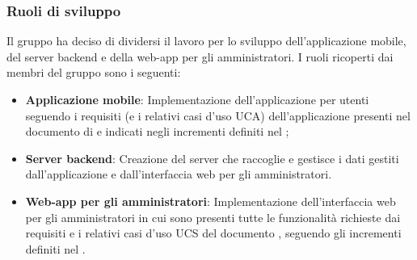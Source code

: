 \subsubsection{Ruoli di sviluppo}
Il gruppo ha deciso di dividersi il lavoro per lo sviluppo dell'applicazione mobile, del server backend e della web-app per gli amministratori. 
I ruoli ricoperti dai membri del gruppo sono i seguenti:
\begin{itemize}
	\item \textbf{Applicazione mobile}: Implementazione dell'applicazione per utenti seguendo i requisiti (e i relativi casi d'uso UCA) dell'applicazione presenti nel documento di \AdR{} e indicati negli incrementi definiti nel \PdP{};
	\item \textbf{Server backend}: Creazione del server che raccoglie e gestisce i dati gestiti dall'applicazione e dall'interfaccia web per gli amministratori.
	\item \textbf{Web-app per gli amministratori}: Implementazione dell'interfaccia web per gli amministratori in cui sono presenti tutte le funzionalità richieste dai requisiti e i relativi casi d'uso UCS del documento \AdR{}, seguendo gli incrementi definiti nel \PdP{}.
\end{itemize}

